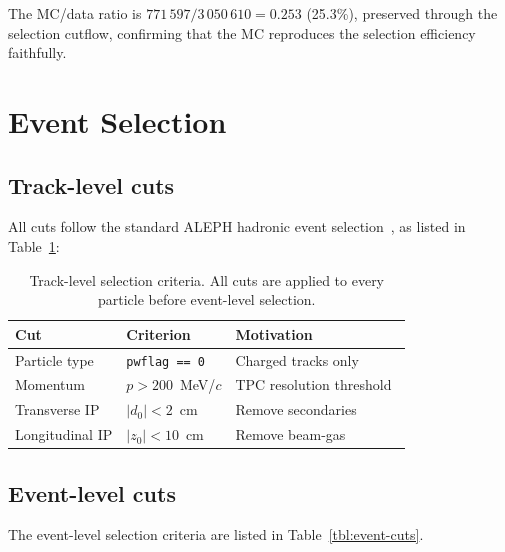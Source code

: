 \documentclass[11pt,a4paper]{article}
\begin{document}
The MC/data ratio is $771\,597 / 3\,050\,610 = 0.253$ (25.3\%),
preserved through the selection cutflow, confirming that the MC
reproduces the selection efficiency faithfully.

\section{Event Selection}
\label{sec:selection}

\subsection{Track-level cuts}
\label{sec:track-cuts}

All cuts follow the standard ALEPH hadronic event
selection~\cite{ALEPH:1998vtv,ALEPH:1998hhr,ALEPH:1999rgl},
as listed in Table~\ref{tbl:track-cuts}:

\begin{table}[htbp]
\centering
\caption{Track-level selection criteria.  All cuts are applied to
  every particle before event-level selection.}
\label{tbl:track-cuts}
\begin{tabular}{lll}
\toprule
Cut & Criterion & Motivation \\
\midrule
Particle type & \texttt{pwflag == 0} & Charged tracks only \\
Momentum & $p > 200$~MeV/$c$ & TPC resolution threshold~\cite{ALEPH:1998hhr} \\
Transverse IP & $|d_0| < 2$~cm & Remove secondaries~\cite{ALEPH:1998vtv} \\
Longitudinal IP & $|z_0| < 10$~cm & Remove beam-gas~\cite{ALEPH:1998vtv} \\
\bottomrule
\end{tabular}
\end{table}

\subsection{Event-level cuts}
\label{sec:event-cuts}

The event-level selection criteria are listed in Table~\ref{tbl:event-cuts}.
\end{document}
